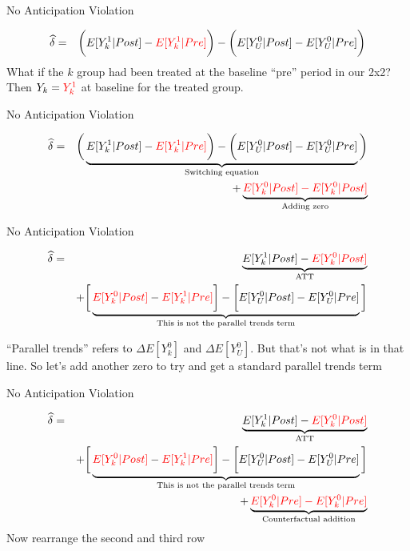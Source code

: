 \documentclass{beamer}
\begin{document}
\begin{frame}{No Anticipation Violation}


\begin{eqnarray*}
\widehat{\delta} &=& \bigg ( E[Y^1_k|Post] - \textcolor{red}{E[Y^1_k|Pre]} \bigg ) - \bigg ( E[Y^0_U | Post ] - E[ Y^0_U | Pre] \bigg) \\
\end{eqnarray*}What if the $k$ group had been treated at the baseline ``pre'' period in our 2x2?   Then $Y_k=\textcolor{red}{Y^1_k}$ at baseline for the treated group.  


\end{frame}


\begin{frame}{No Anticipation Violation}

\begin{eqnarray*}
\widehat{\delta} &=& \bigg ( \underbrace{E[Y^1_k|Post] - \textcolor{red}{E[Y^1_k|Pre] }\bigg ) - \bigg ( E[Y^0_U | Post ] - E[ Y^0_U | Pre]}_{\mathclap{\text{Switching equation}}} \bigg)  \\
&&+ \underbrace{\textcolor{red}{E[Y_k^0 |Post] - E[Y^0_k | Post]}}_{\mathclap{\text{Adding zero}}} 
\end{eqnarray*}


\end{frame}

\begin{frame}{No Anticipation Violation}

\begin{eqnarray*}
\widehat{\delta} &=& \underbrace{E[Y^1_k | Post] - \textcolor{red}{E[Y^0_k | Post]}}_{\mathclap{\text{ATT}}} \\
&& + \bigg [  \underbrace{\textcolor{red}{E[Y^0_k | Post]} - \textcolor{red}{E[Y^1_k | Pre]} \bigg ] - \bigg [ \textcolor{black}{E[Y^0_U | Post]} - E[Y_U^0 | Pre] }_{\mathclap{\text{This is not the parallel trends term}}} \bigg ]
\end{eqnarray*}

``Parallel trends'' refers to  $\Delta E[Y^0_k]$ and $\Delta E[Y^0_U]$.  But that's not what is in that line.  So let's add another zero to try and get a standard parallel trends term

\end{frame}

\begin{frame}{No Anticipation Violation}

\begin{eqnarray*}
\widehat{\delta} &=& \underbrace{E[Y^1_k | Post] - \textcolor{red}{E[Y^0_k | Post]}}_{\mathclap{\text{ATT}}} \\
&& + \bigg [  \underbrace{\textcolor{red}{E[Y^0_k | Post]} - \textcolor{red}{E[Y^1_k | Pre]} \bigg ] - \bigg [ \textcolor{black}{E[Y^0_U | Post]} - E[Y_U^0 | Pre] }_{\mathclap{\text{This is not the parallel trends term}}} \bigg ] \\
&& + \underbrace{ \textcolor{red}{E[Y^0_k|Pre] - E[Y^0_k|Pre]}}_{\mathclap{\text{Counterfactual addition}}}
\end{eqnarray*} Now rearrange the second and third row

\end{frame}
\end{document}
